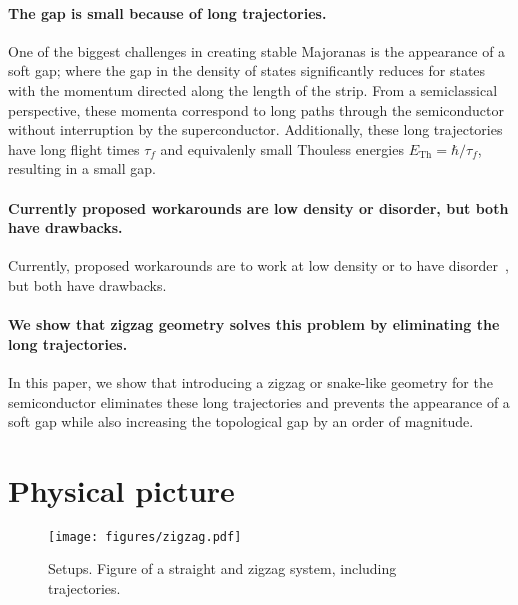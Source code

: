 \documentclass[english, twocolumn, 10pt, aps, superscriptaddress, floatfix, prb, citeautoscript]{revtex4-1}
\renewcommand{\comment}[2]{#2}
\renewcommand{\comment}{\paragraph}
\begin{document}
\comment{The gap is small because of long trajectories.}
One of the biggest challenges in creating stable Majoranas is the appearance of a soft gap; where the gap in the density of states significantly reduces for states with the momentum directed along the length of the strip.  %
From a semiclassical perspective, these momenta correspond to long paths through the semiconductor without interruption by the superconductor.
Additionally, these long trajectories have long flight times $\tau_f$ and equivalenly small Thouless energies $E_{\textrm{Th}}=\hbar / \tau_f$, resulting in a small gap.

\comment{Currently proposed workarounds are low density or disorder, but both have drawbacks.}
Currently, proposed workarounds are to work at low density \cite{nijholt2015orbital} or to have disorder~\cite{haim_double-edge_2018}, but both have drawbacks.

\comment{We show that zigzag geometry solves this problem by eliminating the long trajectories.}
In this paper, we show that introducing a zigzag or snake-like geometry for the semiconductor eliminates these long trajectories and prevents the appearance of a soft gap while also increasing the topological gap by an order of magnitude.


\section{Physical picture}\label{sec:physical_picture}

\begin{figure}[!htb]
\texttt{[image: figures/zigzag.pdf]}
\caption{Setups. Figure of a straight and zigzag system, including trajectories.
\label{fig:setup}}
\end{figure}
\end{document}
